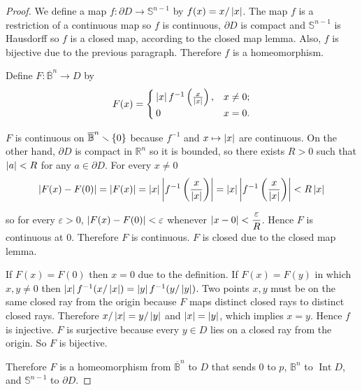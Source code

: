 \begin{proof}
	We define a map \( f: \partial D \to \mathbb{S}^{n-1} \) by \( f(x) = x/\left\vert{x}\right\vert \). The map \( f \) is a restriction of a continuous map so \( f \) is continuous, \( \partial D \) is compact and \( \mathbb{S}^{n-1} \) is Hausdorff so \( f \) is a closed map, according to the closed map lemma. Also, \( f \) is bijective due to the previous paragraph. Therefore \( f \) is a homeomorphism.

	Define \( F: \overline{\mathbb{B}}^{n} \to D \) by
	\begin{align*}
		F(x) = \begin{cases}
			       \left\vert{x}\right\vert f^{-1}\left(\frac{x}{\left\vert{x}\right\vert}\right), & x\ne 0; \\
			       0                                             & x = 0.
		       \end{cases}
	\end{align*}

	\( F \) is continuous on \( \overline{\mathbb{B}}^{n}\smallsetminus\left\{{0}\right\} \) because \( f^{-1} \) and \( x\mapsto \left\vert{x}\right\vert \) are continuous. On the other hand, \( \partial D \) is compact in \( \mathbb{R}^{n} \) so it is bounded, so there exists \( R > 0 \) such that \( \left\vert{a}\right\vert < R \) for any \( a \in \partial D \). For every \( x \ne 0 \)
	\begin{align*}
		\left\vert{F(x) - F(0)}\right\vert = \left\vert{F(x)}\right\vert = \left\vert{x}\right\vert\left\vert{f^{-1}\left(\frac{x}{\left\vert{x}\right\vert}\right)}\right\vert = \left\vert{x}\right\vert\left\vert{f^{-1}\left(\frac{x}{\left\vert{x}\right\vert}\right)}\right\vert < R\left\vert{x}\right\vert
	\end{align*}

	so for every \( \varepsilon > 0 \), \( \left\vert{F(x) - F(0)}\right\vert < \varepsilon \) whenever \( \left\vert{x - 0}\right\vert < \dfrac{\varepsilon}{R} \). Hence \( F \) is continuous at \( 0 \). Therefore \( F \) is continuous. \( F \) is closed due to the closed map lemma.

	If \( F(x) = F(0) \) then \( x = 0 \) due to the definition. If \( F(x) = F(y) \) in which \( x, y\ne 0 \) then \( \left\vert{x}\right\vert f^{-1}(x/\left\vert{x}\right\vert) = \left\vert{y}\right\vert f^{-1}(y/\left\vert{y}\right\vert) \). Two points \( x, y \) must be on the same closed ray from the origin because \( F \) maps distinct closed rays to distinct closed rays. Therefore \( x/\left\vert{x}\right\vert = y/\left\vert{y}\right\vert \) and \( \left\vert{x}\right\vert = \left\vert{y}\right\vert \), which implies \( x = y \). Hence \( f \) is injective. \( F \) is surjective because every \( y\in D \) lies on a closed ray from the origin. So \( F \) is bijective.

	Therefore \( F \) is a homeomorphism from \( \overline{\mathbb{B}}^{n} \) to \( D \) that sends \( 0 \) to \( p \), \( \mathbb{B}^{n} \) to \( \operatorname{Int} D \), and \( \mathbb{S}^{n-1} \) to \( \partial D \).
\end{proof}

